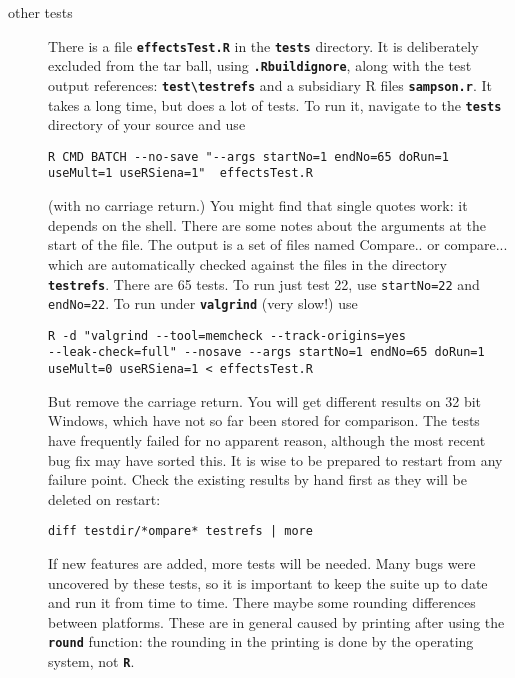 \documentclass[12pt, a4paper]{article}
\renewcommand{\=}{\,=\,}
\newcommand{\+}{\,+\,}
\newcommand{\sfn}[1]{\textbf{\texttt{#1}}}
\begin{document}
\begin{description}
\item[other tests]
There is a file \sfn{effectsTest.R} in the \sfn{tests} directory. It is
deliberately excluded from the tar ball, using \sfn{.Rbuildignore}, along with
the test output references: \sfn{test\textbackslash testrefs} and a subsidiary R
files \sfn{sampson.r}. It takes a
long time, but does a lot of tests. To run it, navigate to the \sfn{tests}
directory of your source and use
\begin{verbatim}
R CMD BATCH --no-save "--args startNo=1 endNo=65 doRun=1
useMult=1 useRSiena=1"  effectsTest.R
\end{verbatim}
(with no carriage return.)  You might find that single quotes work: it depends
on the shell. There are some notes about the arguments at the start of the
file. The output is a set of files named Compare.. or compare... which are
automatically checked against the files in the directory \sfn{testrefs}. There
are 65 tests. To run just test 22, use \verb|startNo=22| and \verb|endNo=22|. To
run under \sfn{valgrind} (very slow!) use
\begin{verbatim}
R -d "valgrind --tool=memcheck --track-origins=yes
--leak-check=full" --nosave --args startNo=1 endNo=65 doRun=1
useMult=0 useRSiena=1 < effectsTest.R
\end{verbatim}
But remove the carriage return.  You will get different results on 32 bit
Windows, which have not so far been stored for comparison. The tests have
frequently failed for no apparent reason, although the most recent bug fix may
have sorted this. It is wise to
be prepared to restart from any failure point. Check the existing results by
hand first as they will be deleted on restart:
\begin{verbatim}
diff testdir/*ompare* testrefs | more
\end{verbatim}
If new features are added, more tests will be needed. Many bugs were uncovered
by these tests, so it is important to keep the suite up to date and run it from
time to time. There maybe some rounding differences between platforms. These are
in general caused by printing after using the \sfn{round} function: the rounding
in the printing is done by the operating system, not \sfn{R}.

\end{description}
\end{document}
